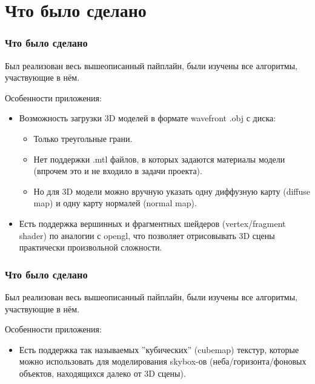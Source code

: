 \documentclass{beamer}
\begin{document}
\section{Что было сделано}
\begin{frame}
	\frametitle{Что было сделано}
	
	Был реализован весь вышеописанный пайплайн, были изучены все алгоритмы, участвующие в нём. 
	
	Особенности приложения: 
	
	\begin{itemize}
		\item<1-> Возможность загрузки 3D моделей в формате wavefront .obj с диска:
		\begin{itemize}
			\item<2-> Только треугольные грани. 
			\item<3-> Нет поддержки .mtl файлов, в которых задаются материалы модели (впрочем это и не входило в задачи проекта).
			\item<4-> Но для 3D модели можно вручную указать одну диффузную карту (diffuse map) и одну карту нормалей (normal map). 
		\end{itemize}
	
		\item<5-> Есть поддержка вершинных и фрагментных шейдеров (vertex/fragment shader) по аналогии с opengl, что позволяет отрисовывать 3D сцены практически произвольной сложности.
			
	\end{itemize}
\end{frame}

\begin{frame}
	\frametitle{Что было сделано}
	
	Был реализован весь вышеописанный пайплайн, были изучены все алгоритмы, участвующие в нём. 
	
	Особенности приложения: 
	
	\begin{itemize}
		\item<1-> Есть поддержка так называемых ''кубических'' (cubemap) текстур, которые можно использовать для моделирования skybox-ов (неба/горизонта/фоновых объектов, находящихся далеко от 3D сцены).
		
	\end{itemize}
\end{frame}
\end{document}

